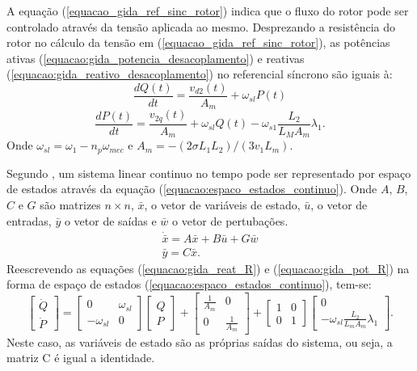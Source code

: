 	A equação (\ref{equacao_gida_ref_sinc_rotor}) indica que o fluxo do rotor pode ser controlado através da tensão aplicada ao mesmo. Desprezando a resistência do rotor no cálculo da tensão em (\ref{equacao_gida_ref_sinc_rotor}), as potências ativas (\ref{equacao:gida_potencia_desacoplamento}) e reativas (\ref{equacao:gida_reativo_desacoplamento}) no referencial síncrono são iguais à:
	\begin{equation}
		\label{equacao:gida_reat_R}
		\frac{dQ(t)}{dt}=\frac{v_{d2}(t)}{A_m}+\omega_{sl}P(t)		
	\end{equation}
	\begin{equation}
		\label{equacao:gida_pot_R}
		\frac{dP(t)}{dt}=\frac{v_{2q}(t)}{A_m}+\omega_{sl}Q(t)-\omega_{s1}\frac{L_2}{L_MA_m}\lambda_1.
	\end{equation}
	Onde $\omega_{sl}=\omega_1-n_p\omega_{mec}$ e $A_m=-(2\sigma L_1L_2)/(3v_1L_m)$.
	
	Segundo , um sistema linear continuo no tempo pode ser representado por espaço de estados através da equação (\ref{equacao:espaco_estados_continuo}). Onde $A$, $B$, $C$ e $G$ são matrizes $n \times n$, $\bar{x}$, o vetor de variáveis de estado, $\bar{u}$, o vetor de entradas, $\bar{y}$ o vetor de saídas e $\bar{w}$ o vetor de pertubações.
	\begin{equation}
		\label{equacao:espaco_estados_continuo}
		\begin{split}
			\dot{\bar{x}}=A\bar{x}+B\bar{u}+G\bar{w} \\
			\bar{y}=C\bar{x}.
		\end{split}
	\end{equation}
	Reescrevendo as equações (\ref{equacao:gida_reat_R}) e (\ref{equacao:gida_pot_R}) na forma de espaço de estados (\ref{equacao:espaco_estados_continuo}), tem-se:
	\begin{equation}
		\label{equacao:espaco_estados_gida}
		\begin{bmatrix}
			\dot{Q} \\ \dot{P}
		\end{bmatrix} =
		\begin{bmatrix}
			0            & \omega_{sl} \\
			-\omega_{sl} & 0
		\end{bmatrix}
		\begin{bmatrix}
			Q \\
			P
		\end{bmatrix} + 
		\begin{bmatrix}
			\frac{1}{A_m} & 0 \\
			0 & \frac{1}{A_m}
		\end{bmatrix} + 
		\begin{bmatrix}
			1 & 0 \\
			0 & 1
		\end{bmatrix}
		\begin{bmatrix}
			0 \\
			-\omega_{sl}\frac{L_2}{L_mA_m}\lambda_1
		\end{bmatrix}.
	\end{equation}
	Neste caso, as variáveis de estado são as próprias saídas do sistema, ou seja, a matriz C é igual a identidade.
	
